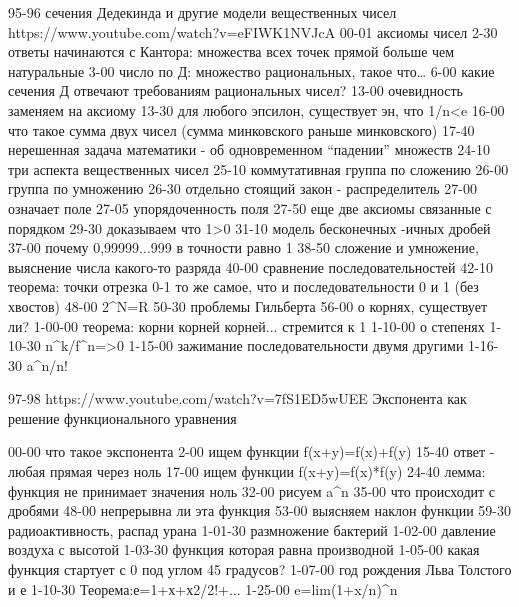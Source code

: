 95-96
сечения Дедекинда и другие модели вещественных чисел
https://www.youtube.com/watch?v=eFIWK1NVJcA
00-01 аксиомы чисел
2-30 ответы начинаются с Кантора: множества всех точек прямой больше чем натуральные
3-00 число по Д: множество рациональных, такое что…
6-00 какие сечения Д отвечают требованиям рациональных чисел?
13-00 очевидность заменяем на аксиому
13-30 для любого эпсилон, существует эн, что 1/n<e
16-00 что такое сумма двух чисел (сумма минковского раньше минковского)
17-40 нерешенная задача математики - об одновременном “падении” множеств
24-10 три аспекта вещественных чисел
25-10 коммутативная группа по сложению
26-00 группа по умножению
26-30 отдельно стоящий закон - распределитель
27-00 означает поле
27-05 упорядоченность поля
27-50 еще две аксиомы связанные с порядком
29-30 доказываем что 1>0
31-10 модель бесконечных -ичных дробей
37-00 почему 0,99999...999 в точности равно 1
38-50 сложение и умножение, выяснение числа какого-то разряда
40-00 сравнение последовательностей
42-10 теорема: точки отрезка 0-1  то же самое, что и последовательности 0 и 1 (без хвостов)
48-00 2^N=R
50-30 проблемы Гильберта
56-00 о корнях, существует ли?
1-00-00 теорема: корни корней корней... стремится к 1
1-10-00 о степенях
1-10-30 n^k/f^n=>0
1-15-00 зажимание последовательности двумя другими
1-16-30 a^n/n!

97-98
https://www.youtube.com/watch?v=7fS1ED5wUEE
Экспонента как решение функционального уравнения

00-00 что такое экспонента
2-00 ищем функции f(x+y)=f(x)+f(y)
15-40 ответ - любая прямая через ноль
17-00 ищем функции f(x+y)=f(x)*f(y)
24-40 лемма: функция не принимает значения ноль
32-00 рисуем a^n
35-00 что происходит с дробями
48-00 непрерывна ли эта функция
53-00 выясняем наклон функции
59-30 радиоактивность, распад урана
1-01-30 размножение бактерий
1-02-00 давление воздуха с высотой
1-03-30 функция которая равна производной
1-05-00 какая функция стартует с 0 под углом 45 градусов?
1-07-00 год рождения Льва Толстого и е
1-10-30 Теорема:е=1+х+х2/2!+...
1-25-00 e=lim(1+x/n)^n

